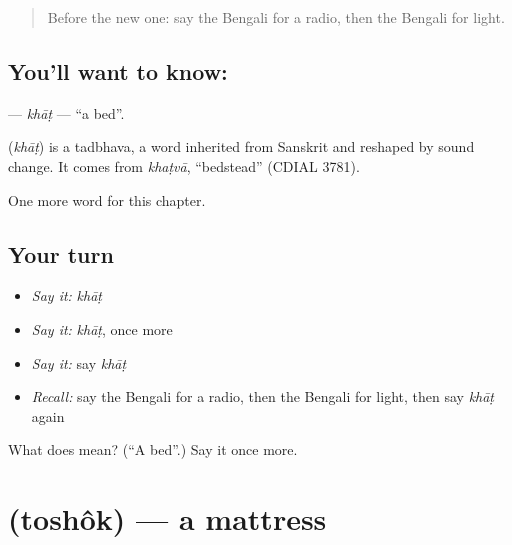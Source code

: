 \label{lesson:BN-C132-khat}



\begin{quote}
Before the new one: say the Bengali for a radio, then the Bengali for light.
\end{quote}

\subsection*{You'll want to know: }
\textbf{} — \emph{khāṭ} — \textquotedblleft{}a bed\textquotedblright{}.

\begin{cousinweb}
\textbf{} (\emph{khāṭ}) is a tadbhava, a word inherited from Sanskrit and reshaped by sound change. It comes from \emph{khaṭvā}, \textquotedblleft{}bedstead\textquotedblright{} (CDIAL 3781).
\end{cousinweb}

\begin{grammarlens}[title={What you've built}]
One more word for this chapter.
\end{grammarlens}

\subsection*{Your turn}
\begin{itemize}
\raggedright
  \item \emph{Say it:} \emph{khāṭ}
  \item \emph{Say it:} \emph{khāṭ}, once more
  \item \emph{Say it:} say \emph{khāṭ}
  \item \emph{Recall:} say the Bengali for a radio, then the Bengali for light, then say \emph{khāṭ} again
\end{itemize}

\begin{tcolorbox}[breakable,colback=teal!4,colframe=teal!35!black,title={Before you move on}]
What does  mean? (\textquotedblleft{}A bed\textquotedblright{}.) Say it once more.
\end{tcolorbox}
\section[\texorpdfstring{\bn{তোশক} (toshôk)}{তোশক (toshôk)}]{ (toshôk) — a mattress}

\label{lesson:BN-C132-toshok}



